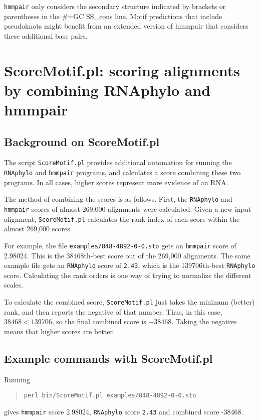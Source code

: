 \documentclass[letterpaper,12pt]{report}
\begin{document}
{\tt hmmpair} only considers the secondary structure indicated by brackets or parentheses in the \#=GC SS\_cons line.  Motif predictions that include pseudoknots might benefit from an extended version of hmmpair that considers these additional base pairs.

\chapter{ScoreMotif.pl: scoring alignments by combining RNAphylo and hmmpair}
\label{sec:ScoreMotif}

\section{Background on ScoreMotif.pl}

The script {\tt ScoreMotif.pl} provides additional automation for running the {\tt RNAphylo} and {\tt hmmpair} programs, and calculates a score combining these two programs.  In all cases, higher scores represent more evidence of an RNA.

The method of combining the scores is as follows.  First, the {\tt RNAphylo} and {\tt hmmpair} scores of almost 269,000 alignments were calculated.  Given a new input alignment, {\tt ScoreMotif.pl} calculates the rank index of each score within the almost 269,000 scores.

For example, the file {\tt examples/848-4892-0-0.sto} gets an {\tt hmmpair} score of 2.98024.  This is the 38468th-best score out of the 269,000 alignments. The same example file gets an {\tt RNAphylo} score of {\tt 2.43}, which is the 139706th-best {\tt RNAphylo} score.  Calculating the rank orders is one way of trying to normalize the different scales.

To calculate the combined score, {\tt ScoreMotif.pl} just takes the minimum (better) rank, and then reports the negative of that number.  Thus, in this case, $38468<139706$, so the final combined score is $-38468$.  Taking the negative means that higher scores are better.

\section{Example commands with ScoreMotif.pl}

Running
\begin{quote}
{\tt perl bin/ScoreMotif.pl examples/848-4892-0-0.sto}
\end{quote}
gives {\tt hmmpair} score 2.98024, {\tt RNAphylo} score {\tt 2.43} and combined score -38468.
\end{document}
